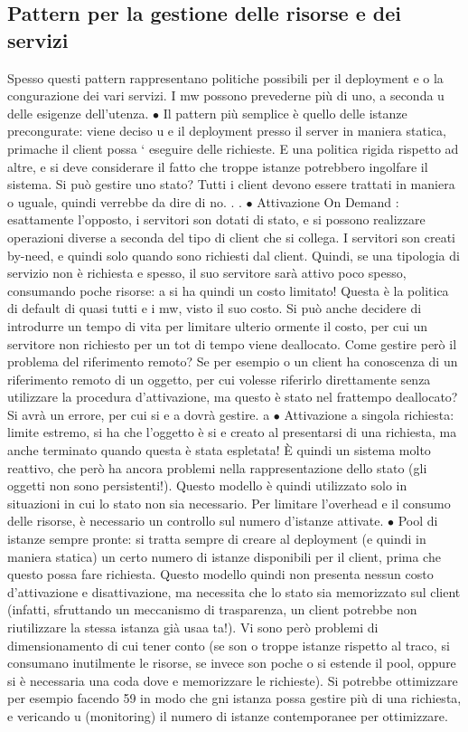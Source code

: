 \documentclass[a4paper,12pt]{article}
\begin{document}
\subsection{Pattern per la gestione delle risorse e dei servizi}
Spesso questi pattern rappresentano politiche possibili per il deployment e o la
congurazione dei vari servizi. I mw possono prevederne più di uno, a seconda
u
delle esigenze dell'utenza.
$\bullet$ Il pattern più semplice è quello delle istanze precongurate: viene deciso
u
e
il deployment presso il server in maniera statica, primache il client possa
`
eseguire delle richieste. E una politica rigida rispetto ad altre, e si deve
considerare il fatto che troppe istanze potrebbero ingolfare il sistema. Si
può gestire uno stato? Tutti i client devono essere trattati in maniera
o
uguale, quindi verrebbe da dire di no. . .
$\bullet$ Attivazione On Demand : esattamente l'opposto, i servitori son dotati di
stato, e si possono realizzare operazioni diverse a seconda del tipo di client
che si collega. I servitori son creati by-need, e quindi solo quando sono
richiesti dal client. Quindi, se una tipologia di servizio non è richiesta
e
spesso, il suo servitore sarà attivo poco spesso, consumando poche risorse:
a
si ha quindi un costo limitato! Questa è la politica di default di quasi tutti
e
i mw, visto il suo costo.
Si può anche decidere di introdurre un tempo di vita per limitare ulterio
ormente il costo, per cui un servitore non richiesto per un tot di tempo
viene deallocato.
Come gestire però il problema del riferimento remoto? Se per esempio
o
un client ha conoscenza di un riferimento remoto di un oggetto, per cui
volesse riferirlo direttamente senza utilizzare la procedura d'attivazione,
ma questo è stato nel frattempo deallocato? Si avrà un errore, per cui si
e
a
dovrà gestire.
a
$\bullet$ Attivazione a singola richiesta: limite estremo, si ha che l'oggetto è si
e
creato al presentarsi di una richiesta, ma anche terminato quando questa è stata espletata! È quindi un sistema molto
reattivo, che però ha ancora problemi nella rappresentazione dello stato (gli oggetti non sono persistenti!). Questo
modello è quindi utilizzato solo in situazioni in cui lo stato non sia necessario. Per limitare l'overhead e il consumo
delle risorse, è necessario un controllo sul numero d'istanze attivate.
$\bullet$ Pool di istanze sempre pronte: si tratta sempre di creare al deployment
(e quindi in maniera statica) un certo numero di istanze disponibili per
il client, prima che questo possa fare richiesta. Questo modello quindi
non presenta nessun costo d'attivazione e disattivazione, ma necessita che
lo stato sia memorizzato sul client (infatti, sfruttando un meccanismo di
trasparenza, un client potrebbe non riutilizzare la stessa istanza già usaa
ta!). Vi sono però problemi di dimensionamento di cui tener conto (se son
o
troppe istanze rispetto al traco, si consumano inutilmente le risorse, se
invece son poche o si estende il pool, oppure si è necessaria una coda dove
e
memorizzare le richieste). Si potrebbe ottimizzare per esempio facendo
59
in modo che gni istanza possa gestire più di una richiesta, e vericando
u
(monitoring) il numero di istanze contemporanee per ottimizzare.
\end{document}
